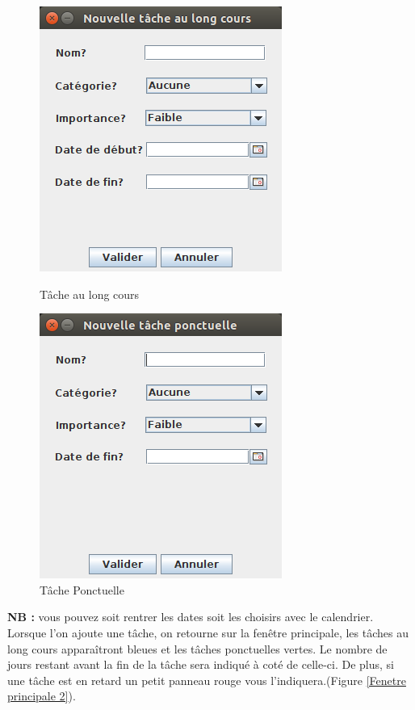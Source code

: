 \documentclass{article}
\begin{document}
\begin{figure}[!ht]
	\centering
	\begin{minipage}[t]{5cm}
		\centering
		\includegraphics [scale=0.34]{images/NewTAsk1.png}
		\caption{Tâche au long cours}
		\label{Tâche au long cours}
	\end{minipage}
	\begin{minipage}[t]{5cm}
		\centering
		\includegraphics [scale=0.34]{images/NewTAsk2.png}
		\caption {Tâche Ponctuelle}
		\label{Tâche Ponctuelle}
	\end{minipage}
\end{figure}

\textbf{NB :} vous pouvez soit rentrer les dates soit les choisirs avec le calendrier.
\newline
\newline
Lorsque l'on ajoute une tâche, on retourne sur la fenêtre principale, les tâches au long cours apparaîtront bleues et les tâches ponctuelles vertes. Le nombre de jours restant avant la fin de la tâche sera indiqué à coté de celle-ci.
De plus, si une tâche est en retard un petit panneau rouge vous l'indiquera.(Figure \ref{Fenetre principale 2}).
\end{document}
